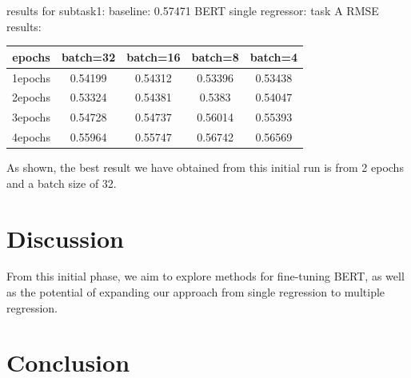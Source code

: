\documentclass{article}
\begin{document}
results for subtask1:
baseline: 0.57471
BERT single regressor:
task A RMSE results:
\begin{center}
\begin{tabular}{|c|c|c|c|c|}
\hline
epochs & batch=32 & batch=16 & batch=8 & batch=4 \\
\hline
1epochs & 0.54199 & 0.54312 & 0.53396 & 0.53438 \\
2epochs & 0.53324 & 0.54381 & 0.5383 & 0.54047 \\
3epochs & 0.54728 & 0.54737 & 0.56014 & 0.55393 \\
4epochs & 0.55964 & 0.55747 & 0.56742 & 0.56569 \\
\hline
\end{tabular}
\end{center}

As shown, the best result we have obtained from this initial run is from 2 epochs and a batch size of 32.

\section{Discussion}

From this initial phase, we aim to explore methods for fine-tuning BERT, as well as the potential of expanding our approach from single regression to multiple regression.

\section{Conclusion}



\end{document}
